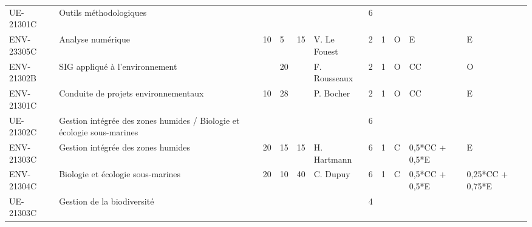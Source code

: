 \documentclass[a4paper,11pt]{article}
\begin{document}
{{\begin{tabular}{lllllllllll}
\rowcolor[HTML]{EFEFEF} 
UE-21301C                          & Outils méthodologiques                                                 &    &    &                           &                                    & 6    &      &             &                                        &                           \\
ENV-23305C                         & Analyse numérique                                                      & 10 & 5  & 15                        & V. Le Fouest                       & 2    & 1    & O           & E                                      & E                         \\
\cellcolor[HTML]{FD6864}ENV-21302B & SIG appliqué à l'environnement                                         &    & 20 &                           & F. Rousseaux                       & 2    & 1    & O           & CC                                     & O                         \\
ENV-21301C                         & Conduite de projets environnementaux                                   & 10 & 28 &                           & P. Bocher                          & 2    & 1    & O           & CC                                     & E                         \\
\rowcolor[HTML]{EFEFEF} 
UE-21302C                          & Gestion intégrée des zones humides / Biologie et écologie sous-marines &    &    &                           &                                    & 6    &      &             &                                        &                           \\
ENV-21303C                         & Gestion intégrée des zones humides                                     & 20 & 15 & 15                        & H. Hartmann                        & 6    & 1    & C           & 0,5*CC + 0,5*E                         & E                         \\
ENV-21304C                         & Biologie et écologie sous-marines                                      & 20 & 10 & 40                        & C. Dupuy                           & 6    & 1    & C           & 0,5*CC + 0,5*E                         & 0,25*CC + 0,75*E          \\
\rowcolor[HTML]{EFEFEF} 
UE-21303C                          & Gestion de la biodiversité                                             &    &    &                           &                                    & 4    &      &             &                                        &                           \\

\end{tabular}}}
\end{document}
